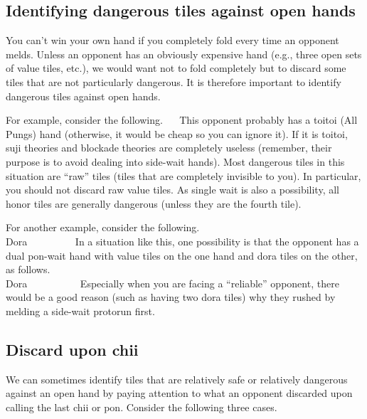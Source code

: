 {{\subsection{Identifying dangerous tiles against open hands}

You can't win your own hand if you completely fold every time an opponent melds. Unless an opponent has an obviously expensive hand (e.g., three open sets of value tiles, etc.), we would want not to fold completely but to discard some tiles that are not particularly dangerous. It is therefore important to identify dangerous tiles against open hands. 

\bigskip
For example, consider the following. 
\bp
{}
\rfa\fa\fa~~
\ep
This opponent probably has a {\jap toitoi} (All Pungs) hand (otherwise, it would be cheap so you can ignore it). If it is {\jap toitoi}, {\jap suji} theories and blockade theories are completely useless (remember, their purpose is to avoid dealing into side-wait hands). 
Most dangerous tiles in this situation are ``raw'' tiles (tiles that are completely invisible to you). In particular, you should not discard raw value tiles. As single wait is also a possibility, all honor tiles are generally dangerous (unless they are the fourth tile). 

\bigskip
For another example, consider the following. 
\vspace{-10pt}
\bp
{}
~~~\\
\hfill\footnotesize{{\jap Dora}~~~~~~~~~}
\ep
In a situation like this, one possibility is that the opponent has a dual {\jap pon}-wait hand with value tiles on the one hand and {\jap dora} tiles on the other, as follows. 
\bp
{}\fa\fa
~~~~\\
\hfill\footnotesize{{\jap Dora}~~~~~~~~~~}
\ep
Especially when you are facing a ``reliable'' opponent, there would be a good reason (such as having two {\jap dora} tiles) why they rushed by melding a side-wait protorun first. 

\newpage
\subsection{Discard upon {\jap chii}}

We can sometimes identify tiles that are relatively safe or relatively dangerous against an open hand by paying attention to what an opponent discarded upon calling the last {\jap chii} or {\jap pon}. Consider the following three cases. 

}}
